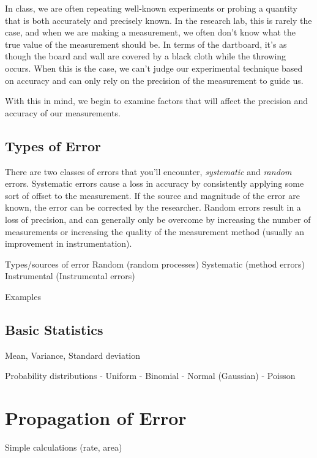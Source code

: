 \documentclass[nobib,nofonts,nols,nohyper]{tufte-handout}
\begin{document}
In class, we are often repeating well-known experiments or probing a quantity that is both accurately and precisely known. 
In the research lab, this is rarely the case, and when we are making a measurement, we often don't know what the true value of the measurement should be. 
In terms of the dartboard, it's as though the board and wall are covered by a black cloth while the throwing occurs. 
When this is the case, we can't judge our experimental technique based on accuracy and can only rely on the precision of the measurement to guide us. 

With this in mind, we begin to examine factors that will affect the precision and accuracy of our measurements. 


\subsection{Types of Error} %
\label{sub:types_of_error}

There are two classes of errors that you'll encounter, \emph{systematic} and \emph{random} errors. Systematic errors cause a loss in accuracy by consistently applying some sort of offset to the measurement. If the source and magnitude of the error are known, the error can be corrected by the researcher. Random errors result in a loss of precision, and can generally only be overcome by increasing the number of measurements or increasing the quality of the measurement method (usually an improvement in instrumentation). 

Types/sources of error
Random (random processes)
Systematic (method errors)
Instrumental (Instrumental errors)

Examples



\subsection{Basic Statistics} %
\label{sub:basic_statistics}

Mean, 
Variance, 
Standard deviation

Probability distributions
- Uniform
- Binomial
- Normal (Gaussian)
- Poisson



\section{Propagation of Error} %
\label{sec:propagation_of_error}

Simple calculations (rate, area)

\nocite{*}
\printbibliography[category=cited]%

\printbibliography[%
  title={Further Reading},%
  resetnumbers,%
  omitnumbers,%
	notcategory=cited,%
	keyword=errors,%
	]
\end{document}
